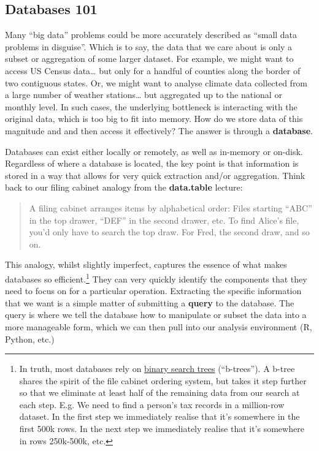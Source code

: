 \documentclass[
]{article}
\begin{document}
\hypertarget{databases-101}{%
\subsection{Databases 101}\label{databases-101}}

Many ``big data'' problems could be more accurately described as ``small
data problems in disguise''. Which is to say, the data that we care
about is only a subset or aggregation of some larger dataset. For
example, we might want to access US Census data\ldots{} but only for a
handful of counties along the border of two contiguous states. Or, we
might want to analyse climate data collected from a large number of
weather stations\ldots{} but aggregated up to the national or monthly
level. In such cases, the underlying bottleneck is interacting with the
original data, which is too big to fit into memory. How do we store data
of this magnitude and and then access it effectively? The answer is
through a \textbf{database}.

Databases can exist either locally or remotely, as well as in-memory or
on-disk. Regardless of where a database is located, the key point is
that information is stored in a way that allows for very quick
extraction and/or aggregation. Think back to our filing cabinet analogy
from the \textbf{data.table} lecture:

\begin{quote}
A filing cabinet arranges items by alphabetical order: Files starting
``ABC'' in the top drawer, ``DEF'' in the second drawer, etc. To find
Alice's file, you'd only have to search the top draw. For Fred, the
second draw, and so on.
\end{quote}

This analogy, whilst slightly imperfect, captures the essence of what
makes databases so efficient.\footnote{In truth, most databases rely on
  \href{https://en.wikipedia.org/wiki/Binary_search_tree}{binary search
  trees} (``b-trees''). A b-tree shares the spirit of the file cabinet
  ordering system, but takes it step further so that we eliminate at
  least half of the remaining data from our search at each step. E.g. We
  need to find a person's tax records in a million-row dataset. In the
  first step we immediately realise that it's somewhere in the first
  500k rows. In the next step we immediately realise that it's somewhere
  in rows 250k-500k, etc.} They can very quickly identify the components
that they need to focus on for a particular operation. Extracting the
specific information that we want is a simple matter of submitting a
\textbf{query} to the database. The query is where we tell the database
how to manipulate or subset the data into a more manageable form, which
we can then pull into our analysis environment (R, Python, etc.)
\end{document}
